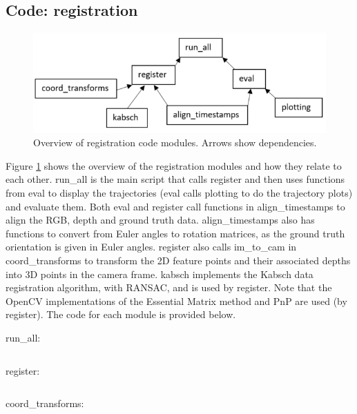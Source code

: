 \documentclass[12pt,a4paper]{article}
\begin{document}

  \newpage
  \subsection{Code: registration}
    \label{s: code reg}
    \begin{figure}[h]
      \centering
        \includegraphics[width=120mm]{diags/code_overview.PNG}
      \caption{Overview of registration code modules. Arrows show dependencies.}
      \label{f: code reg}
    \end{figure}  

  Figure \ref{f: code reg} shows the overview of the registration modules and how they relate to each other. run\_all is the main script that calls register and then uses functions from eval to display the trajectories (eval calls plotting to do the trajectory plots) and evaluate them. Both eval and register call functions in align\_timestamps to align the RGB, depth and ground truth data. align\_timestamps also has functions to convert from Euler angles to rotation matrices, as the ground truth orientation is given in Euler angles. register also calls im\_to\_cam in coord\_transforms to transform the 2D feature points and their associated depths into 3D points in the camera frame. kabsch implements the Kabsch data registration algorithm, with RANSAC, and is used by register. Note that the OpenCV implementations of the Essential Matrix method and PnP are used (by register). The code for each module is provided below.
   
  
  \noindent
  run\_all: 
  \inputminted{python}{../quad/run_all.py}

  \noindent
  register: 
  \inputminted{python}{../quad/register.py}

  \noindent
  coord\_transforms: 
  \inputminted{python}{../quad/coord_transforms.py}
\end{document}
